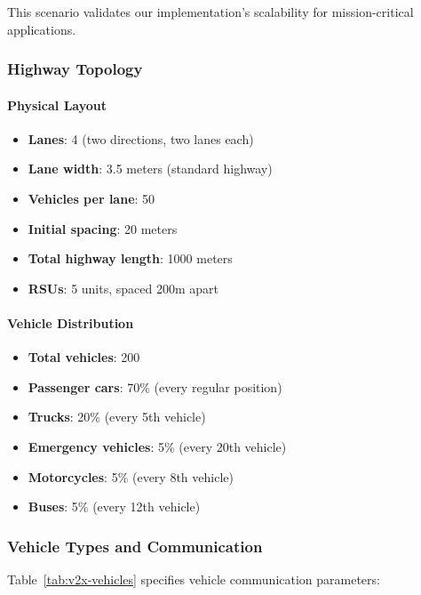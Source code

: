 This scenario validates our implementation's scalability for mission-critical applications.

\subsubsection{Highway Topology}

\paragraph{Physical Layout}
\begin{itemize}
    \item \textbf{Lanes}: 4 (two directions, two lanes each)
    \item \textbf{Lane width}: 3.5 meters (standard highway)
    \item \textbf{Vehicles per lane}: 50
    \item \textbf{Initial spacing}: 20 meters
    \item \textbf{Total highway length}: 1000 meters
    \item \textbf{RSUs}: 5 units, spaced 200m apart
\end{itemize}

\paragraph{Vehicle Distribution}
\begin{itemize}
    \item \textbf{Total vehicles}: 200
    \item \textbf{Passenger cars}: 70\% (every regular position)
    \item \textbf{Trucks}: 20\% (every 5th vehicle)
    \item \textbf{Emergency vehicles}: 5\% (every 20th vehicle)
    \item \textbf{Motorcycles}: 5\% (every 8th vehicle)
    \item \textbf{Buses}: 5\% (every 12th vehicle)
\end{itemize}

\subsubsection{Vehicle Types and Communication}

Table~\ref{tab:v2x-vehicles} specifies vehicle communication parameters:

